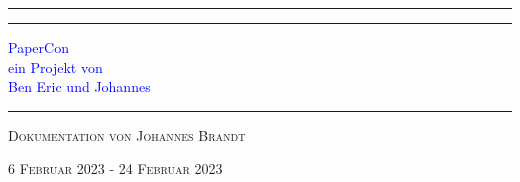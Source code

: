 \documentclass[a4paper, 10pt, oneside]{article} %
\begin{document}

\begin{titlepage}


	\centering 
	
	
	\rule{\textwidth}{1pt} %
	
	\vspace{2pt}\vspace{-\baselineskip}
	
	\rule{\textwidth}{0.4pt} 
	
	\vspace{0.1\textheight} %
	
	
	\textcolor{Blue}{ %
		{\Huge PaperCon}\\[0.5\baselineskip] %
		{\Large ein Projekt von}\\[0.5\baselineskip] %
		{\Huge Ben Eric und Johannes} %
	}
	
	\vspace{0.025\textheight} %
	
	\rule{0.3\textwidth}{0.4pt} %
	
	\vspace{0.1\textheight} %
	
	
	{\Large \textsc{Dokumentation von Johannes Brandt}} %
	
	\vfill %
	
	
	{\large\textsc{6 Februar 2023 - 24 Februar 2023}} %
	

\end{titlepage}
\end{document}

